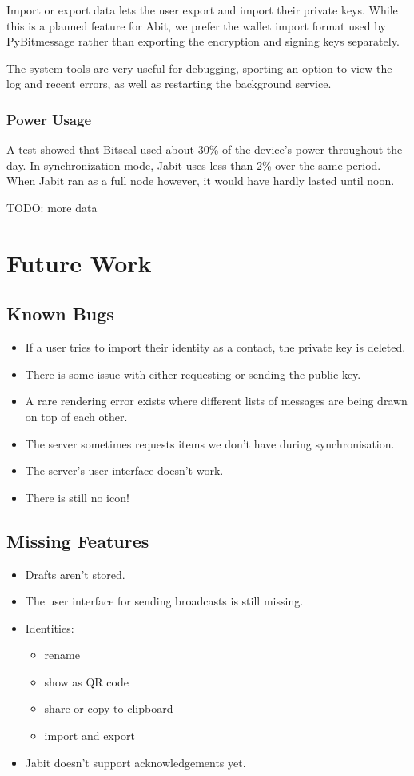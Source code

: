 \documentclass{bfh}
\begin{document}
  Import or export data lets the user export and import their private keys. While this is a planned feature for Abit, we prefer the wallet import format used by PyBitmessage rather than exporting the encryption and signing keys separately.

  The system tools are very useful for debugging, sporting an option to view the log and recent errors, as well as restarting the background service.

  \subsubsection{Power Usage}
  A test showed that Bitseal used about 30\% of the device's power throughout the day. In synchronization mode, Jabit uses less than 2\% over the same period. When Jabit ran as a full node however, it would have hardly lasted until noon.

TODO: more data


  \newpage
  \section{Future Work}
  \subsection{Known Bugs}
  \begin{itemize}
    \item If a user tries to import their identity as a contact, the private key is deleted.
    \item There is some issue with either requesting or sending the public key.
    \item A rare rendering error exists where different lists of messages are being drawn on top of each other.
    \item The server sometimes requests items we don't have during synchronisation.
    \item The server's user interface doesn't work.
    \item There is still no icon!
  \end{itemize}

  \subsection{Missing Features}
  \begin{itemize}
    \item Drafts aren't stored.
    \item The user interface for sending broadcasts is still missing.
    \item Identities:
      \begin{itemize}
        \item rename
        \item show as QR code
        \item share or copy to clipboard
        \item import and export
      \end{itemize}
    \item Jabit doesn't support acknowledgements yet.
  \end{itemize}
\end{document}
